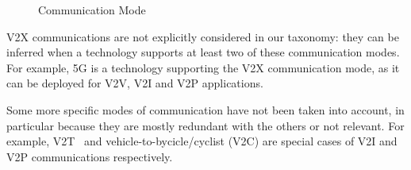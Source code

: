 \begin{figure}[ht!]
  \centering
  \caption{Communication Mode}
  \label{fig:com-mode}
\end{figure}

\acrshort{V2X} communications are not explicitly considered in our taxonomy: they can be inferred when a technology supports at least two of these communication modes. 
For example, 5G is a technology supporting the V2X communication mode, as it can be deployed for V2V, V2I and V2P applications. 


Some more specific modes of communication have not been taken into account, in particular because they are mostly redundant with the others or not relevant. For example, \acrfull{V2T}~\cite{vandung_nguyen_efficient_2016} and vehicle-to-bycicle/cyclist (V2C) are special cases of \acrshort{V2I} and \acrshort{V2P} communications respectively. 

